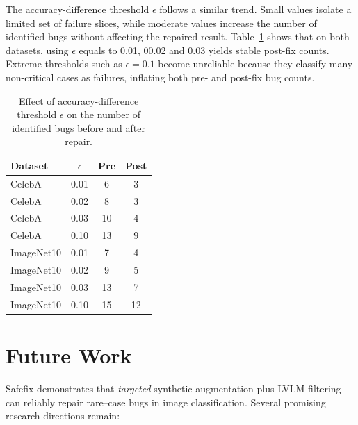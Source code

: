 \documentclass[10pt]{article} %
\newcommand{\model}{Safefix\xspace}
\begin{document}
The accuracy-difference threshold $\epsilon$ follows a similar trend. Small values isolate a limited set of failure slices, while moderate values increase the number of identified bugs without affecting the repaired result. Table~\ref{tab:epsilon_threshold} shows that on both datasets, using \(\epsilon\) equals to 0.01, 00.02 and 0.03 yields stable post-fix counts. Extreme thresholds such as $\epsilon=0.1$ become unreliable because they classify many non-critical cases as failures, inflating both pre- and post-fix bug counts.

\begin{table}[!t]
\centering
\small
\setlength{\tabcolsep}{6pt}
\renewcommand{\arraystretch}{0.95}
\caption{Effect of accuracy-difference threshold $\epsilon$ on the number of identified bugs before and after repair.}
\label{tab:epsilon_threshold}
\begin{tabular}{lccc}
\toprule
\textbf{Dataset} & \boldmath$\epsilon$ & \textbf{Pre} & \textbf{Post} \\
\midrule
CelebA      & 0.01 & 6  & 3 \\
CelebA      & 0.02 & 8  & 3 \\
CelebA      & 0.03 & 10 & 4 \\
CelebA      & 0.10 & 13 & 9 \\
ImageNet10  & 0.01 & 7  & 4 \\
ImageNet10  & 0.02 & 9  & 5 \\
ImageNet10  & 0.03 & 13 & 7 \\
ImageNet10  & 0.10 & 15 & 12 \\
\bottomrule
\end{tabular}
\end{table}


\section{Future Work}
\label{sec:future_work}

\model{} demonstrates that \emph{targeted} synthetic augmentation plus LVLM
filtering can reliably repair rare–case bugs in image classification.  
Several promising research directions remain:
\end{document}
